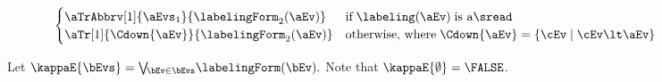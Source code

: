 \begin{figure}
\begin{displaymath}
\begin{cases}
      \aTrAbbrv[1]{\aEvs_1}{\labelingForm_2(\aEv)} & \text{if}\; \labeling(\aEv) \;\text{is a}\sread
      \\
      \aTr[1]{\Cdown{\aEv}}{\labelingForm_2(\aEv)} & \text{otherwise, where}\; \Cdown{\aEv}=\{ \cEv \mid \cEv \lt \aEv \}
    \end{cases}
  \end{displaymath}
  \medskip


  \noindent
  Let 
  \begin{math}
    \kappaE{\bEvs}=
    {\textstyle\bigvee{}\!\!{}_{\bEv\in\bEvs}\labelingForm(\bEv)}.
  \end{math}
  Note that $\kappaE{\emptyset} = \FALSE$.
  \medskip


\end{figure}
